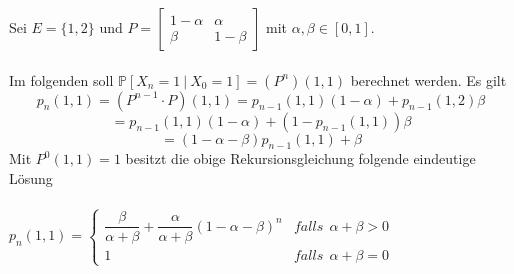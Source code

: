 Sei $E = \lbrace 1,2 \rbrace$ und  $P = \begin{bmatrix} 1 - \alpha & \alpha \\ \beta & 1 - \beta  \end{bmatrix}$ mit $\alpha, \beta \in [0,1].$
\\
\\
Im folgenden soll $\mathbb{P}[X_{n} = 1 \: | \: X_{0} = 1] = (P^{n})(1,1)$ berechnet werden. Es gilt
\begin{equation*}
p_{n}(1,1) = (P^{n-1} \cdot P)(1,1) = p_{n-1}(1,1)(1 - \alpha) + p_{n-1}(1,2)\beta
\end{equation*}
\begin{equation*}
= p_{n-1}(1,1)(1-\alpha) + (1 - p_{n-1}(1,1))\beta
\end{equation*}
\begin{equation*}
= (1-\alpha - \beta)p_{n-1}(1,1) + \beta
\end{equation*}
Mit $P^{0}(1,1) = 1$ besitzt die obige Rekursionsgleichung folgende eindeutige Lösung
\\
\\
$p_{n}(1,1)=
\begin{cases}
\dfrac{\beta}{\alpha + \beta} + \dfrac{\alpha}{\alpha + \beta}(1 - \alpha - \beta)^{n}  &  falls \: \: \alpha + \beta > 0\\
1 & falls \: \: \alpha + \beta = 0
\end{cases}$